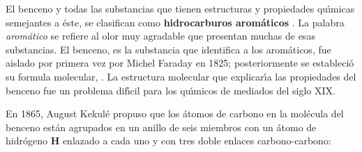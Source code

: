 El benceno y todas las substancias que tienen estructuras y propiedades qu\'{\i}\-mi\-cas
semejantes a \'este, se clasifican como \textbf{hidrocarburos arom\'aticos}
. La palabra \textit{arom\'atico} se refiere al olor muy agradable que presentan muchas de esas substancias. El benceno, es la substancia que identifica a los arom\'aticos, fue aislado por primera vez por Michel Faraday en 1825; posterior\-men\-te se estableci\'o su formula molecular, .  La estructura  molecular que explicar\'{\i}a las propiedades del benceno fue un problema dif\'{\i}cil para los qu\'{\i}micos de mediados del siglo XIX.

En 1865, August Kekul\'e propuso que los \'atomos de carbono en la mol\'e\-cula del benceno est\'an agrupados en un anillo de seis miembros con un \'atomo de hidr\'ogeno \textbf{H} enlazado a cada uno y con tres doble enlaces carbono-carbono:

